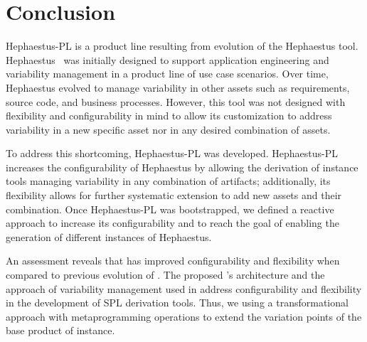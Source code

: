 \section{Conclusion}
\label{conclusion}

Hephaestus-PL is a product line resulting from evolution of the Hephaestus tool. 
Hephaestus~\cite{rbonifacio:sbcars2009} was initially designed to support application engineering and variability management in a product line of use case scenarios.
Over time, Hephaestus evolved to manage variability in other assets such as requirements, source code, and business processes. However, this tool was not designed with flexibility and configurability in mind to allow its customization to address variability in a new specific asset nor in any desired combination of assets.

To address this shortcoming, Hephaestus-PL was developed. 
Hephaestus-PL increases the configurability of Hephaestus by allowing the derivation of instance tools managing variability in any combination of artifacts; additionally, its flexibility allows for further systematic extension to add new assets and their combination. 
Once Hephaestus-PL was bootstrapped, we defined a reactive approach to increase its configurability and to reach the goal of enabling the generation of different instances of Hephaestus.

An assessment reveals that \hpl{} has improved configurability and flexibility when compared to previous evolution of \hp.
The proposed \hpl{}'s architecture and the approach of variability management used in \hpl{} address configurability and flexibility in the development of SPL derivation tools. Thus, we using a transformational approach with metaprogramming operations to extend the variation points of the base product of \hpl{} instance. 

